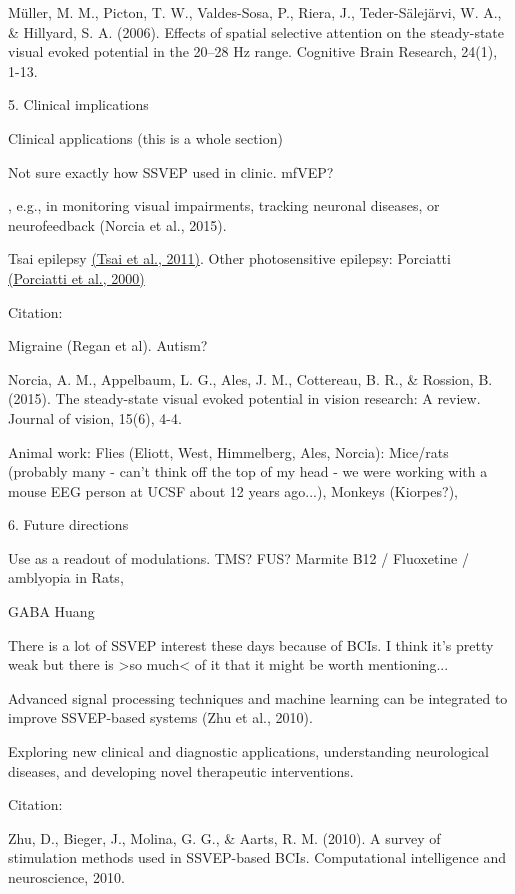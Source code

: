 \documentclass[
  letterpaper,
  DIV=11,
  numbers=noendperiod]{scrartcl}
\begin{document}
Müller, M. M., Picton, T. W., Valdes-Sosa, P., Riera, J.,
Teder-Sälejärvi, W. A., \& Hillyard, S. A. (2006). Effects of spatial
selective attention on the steady-state visual evoked potential in the
20--28 Hz range. Cognitive Brain Research, 24(1), 1-13.

5. Clinical implications

\label{anchor-9}{}Clinical applications (this is a whole
section)

Not sure exactly how SSVEP used in clinic. mfVEP?

, e.g., in monitoring visual impairments, tracking neuronal diseases, or
neurofeedback (Norcia et al., 2015).

Tsai epilepsy \href{https://www.zotero.org/google-docs/?AdhH3f}{(Tsai et
al., 2011)}. Other photosensitive epilepsy: Porciatti
\href{https://www.zotero.org/google-docs/?UTBQbV}{(Porciatti et al.,
2000)}

Citation:

Migraine (Regan et al). Autism?

Norcia, A. M., Appelbaum, L. G., Ales, J. M., Cottereau, B. R., \&
Rossion, B. (2015). The steady-state visual evoked potential in vision
research: A review. Journal of vision, 15(6), 4-4.

Animal work: Flies (Eliott, West, Himmelberg, Ales, Norcia): Mice/rats
(probably many - can't think off the top of my head - we were working
with a mouse EEG person at UCSF about 12 years ago...), Monkeys
(Kiorpes?),

\label{anchor-10}{}6. Future directions

Use as a readout of modulations. TMS? FUS? Marmite B12 / Fluoxetine /
amblyopia in Rats,

GABA Huang

There is a lot of SSVEP interest these days because of BCIs. I think
it's pretty weak but there is \textgreater so much\textless{} of it that
it might be worth mentioning...

Advanced signal processing techniques and machine learning can be
integrated to improve SSVEP-based systems (Zhu et al., 2010).

Exploring new clinical and diagnostic applications, understanding
neurological diseases, and developing novel therapeutic interventions.

Citation:

Zhu, D., Bieger, J., Molina, G. G., \& Aarts, R. M. (2010). A survey of
stimulation methods used in SSVEP-based BCIs. Computational intelligence
and neuroscience, 2010.
\end{document}
